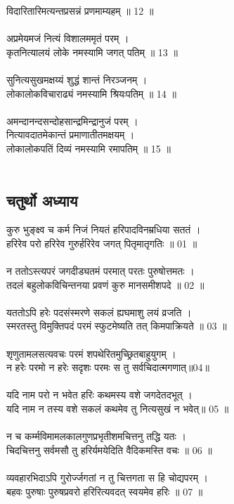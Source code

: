 विदारितारिमत्यन्तप्रसन्नं प्रणमाम्यहम् ॥ 12 ॥\\
\\
अप्रमेयमजं नित्यं विशालममृतं परम् ।\\
कृतनित्यालयं लोके नमस्यामि जगत् पतिम् ॥ 13 ॥\\
\\
सुनित्यसुखमक्षय्यं शुद्धं शान्तं निरञ्जनम् ।\\
लोकालोकविचाराढ्यं नमस्यामि श्रियःपतिम् ॥ 14 ॥\\
\\
अमन्दानन्दसन्दोहसान्द्रमिन्द्रानुजं परम् ।\\
नित्यावदातमेकान्तं प्रमाणातीतमक्षयम् ।\\
लोकालोकपतिं दिव्यं नमस्यामि रमापतिम् ॥ 15 ॥\\
\\
\subsection{\sanskrit चतुर्थो अध्याय}
\sanskrit
कुरु भुङ्क्ष्व च कर्म निजं नियतं हरिपादविनम्रधिया सततं ।\\
हरिरेव परो हरिरेव गुरुर्हरिरेव जगत् पितृमातृगतिः ॥ 01 ॥\\
\\
 न ततोऽस्त्यपरं जगदीड्यतमं परमात् परतः पुरुषोत्तमतः ।\\
तदलं बहुलोकविचिन्तनया प्रवणं कुरु मानसमीशपदे ॥ 02 ॥\\
\\
 यततोऽपि हरेः पदसंस्मरणे सकलं ह्यघमाशु लयं व्रजति ।\\
स्मरतस्तु विमुक्तिपदं परमं स्फुटमेष्यति तत् किमपाक्रियते ॥ 03 ॥\\
\\
 शृणुतामलसत्यवचः परमं शपथेरितमुच्छ्रितबाहुयुगम् ।\\
न हरेः परमो न हरेः सदृशः परमः स तु सर्वचिदात्मगणात्॥04॥\\
\\
यदि नाम परो न भवेत हरिः कथमस्य वशे जगदेतदभूत् ।\\
यदि नाम न तस्य वशे सकलं कथमेव तु नित्यसुखं न भवेत्॥ 05 ॥\\
\\
न च कर्म्मविमामलकालगुणप्रभृतीशमचित्तनु तद्धि यतः ।\\
चिदचित्तनु सर्वमसौ तु हरिर्यमयेदिति वैदिकमस्ति वचः ॥ 06 ॥\\
\\
व्यवहारभिदाऽपि गुरोर्ज्जगतां न तु चित्तगता स हि चोद्यपरम् ।\\
बहवः पुरुषाः पुरुषप्रवरो हरिरित्यवदत् स्वयमेव हरिः ॥ 07 ॥\\
